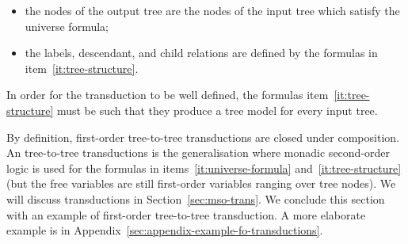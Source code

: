 \begin{definition}
\begin{enumerate}
    \begin{itemize}
        \item the nodes of the output tree are the nodes of the input tree which satisfy the universe formula;
        \item the labels, descendant, and child relations are defined by the formulas in item~\ref{it:tree-structure}.
    \end{itemize}
    In order for the transduction to be well defined, the formulas item~\ref{it:tree-structure} must be such that they produce a tree model for every input tree.
 \end{enumerate}
\end{definition}

By definition, first-order tree-to-tree transductions are closed under composition. An \mso tree-to-tree transductions is the generalisation where monadic second-order logic \mso is used for the formulas in items~\ref{it:universe-formula} and~\ref {it:tree-structure} (but the free variables are still first-order variables ranging over tree nodes). We will discuss \mso transductions in  Section~\ref{sec:mso-trans}.  We conclude this section with an example of first-order tree-to-tree transduction. A more elaborate example is in Appendix~\ref{sec:appendix-example-fo-transductions}.

    
    


